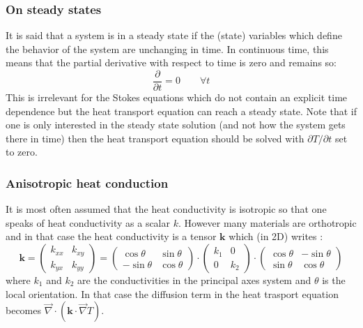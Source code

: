 \subsubsection{On steady states}

It is said that a system is in a steady state if the (state) variables which define the behavior of the system 
are unchanging in time. In continuous time, this means that the partial derivative with respect to time is zero and remains so:
\[
\frac{\partial}{\partial t} =0 \qquad \forall t
\]
This is irrelevant for the Stokes equations which do not contain an explicit time dependence but the heat 
transport equation can reach a steady state. 
Note that if one is only interested in the steady state solution (and not how the system gets there in time)
then the heat transport equation should be solved with $\partial T/\partial t$ set to zero. 

\subsubsection{Anisotropic heat conduction}\label{sec:anisotropic}


It is most often assumed that the heat conductivity is isotropic so that one speaks of heat conductivity as a 
scalar $k$.  However many materials are orthotropic and in that case the heat conductivity is a tensor ${\bm k}$
which (in 2D) writes \cite[p121]{reddybook2}:
\[
{\bm k}
=
\left(
\begin{array}{cc}
k_{xx} & k_{xy} \\
k_{yx} & k_{yy}
\end{array}
\right)
=
\left(
\begin{array}{cc}
\cos\theta & \sin\theta \\
-\sin\theta & \cos\theta
\end{array}
\right)
\cdot
\left(
\begin{array}{cc}
k_1 & 0 \\ 0 & k_2
\end{array}
\right)
\cdot
\left(
\begin{array}{cc}
\cos\theta & -\sin\theta \\
\sin\theta & \cos\theta
\end{array}
\right)
\]
where $k_1$ and $k_2$ are the conductivities in the principal axes system and $\theta$ is 
the local orientation.
In that case the diffusion term in the heat trasport equation becomes $\vec{\nabla}\cdot({\bm k}\cdot \vec{\nabla}T)$.



